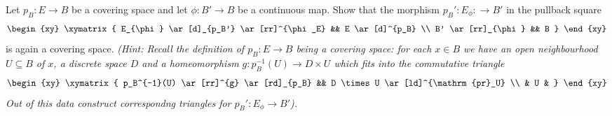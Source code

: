 \documentclass[11pt]{book}
\numberwithin{dummy}{section}
\theoremstyle{nonumberbreak}
\newenvironment{prob}[1][]{\ifthenelse{\equal{#1}{}}{\problem}{\problem[#1]}\rm}{\endproblem}
\newcommand{\la}{\longrightarrow}
\begin{document}
\begin{spacing}{1.4}
\begin{prob}    %
Let $p_B: E \la B$ be a covering space and let $\phi: B' \la B$ be a continuous map. Show that the morphism $p_B': E_{\phi}: \la B'$ in the pullback square
$$
\begin{xy}
\xymatrix{
E_{\phi} \ar[d]_{p_B'} \ar[rr]^{\phi_E} && E \ar[d]^{p_B} \\ B' \ar[rr]_{\phi} && B
}
\end{xy}
$$
is again a covering space. \textit{(Hint: Recall the definition of $p_B: E \la B$ being a covering space: for each $x \in B$ we have an open neighbourhood $U \subseteq B$ of $x$, a discrete space $D$ and a homeomorphism $g: p_B^{-1}(U) \la D \times U$ which fits into the commutative triangle}
$$
\begin{xy}
\xymatrix{
p_B^{-1}(U) \ar[rr]^{g} \ar[rd]_{p_B} && D \times U \ar[ld]^{\mathrm{pr}_U} \\ & U &
} 
\end{xy}
$$
\textit{Out of this data construct correspondng triangles for $p_B': E_{\phi} \la B'$).}


\end{prob}
\end{spacing}
\end{document}
